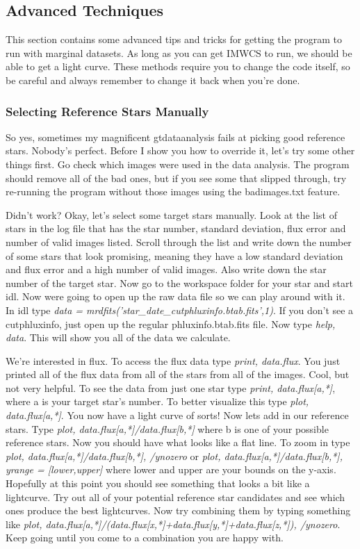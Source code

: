 \documentclass[10pt,preprint]{aastex}
\begin{document}
\subsection{Advanced Techniques}
This section contains some advanced tips and tricks for getting the program to run with marginal datasets. As long as you can get IMWCS to run, we should be able to get a light curve. These methods require you to change the code itself, so be careful and always remember to change it back when you're done.
\subsubsection{Selecting Reference Stars Manually}
So yes, sometimes my magnificent gtdataanalysis fails at picking good reference stars. Nobody's perfect. Before I show you how to override it, let's try some other things first. Go check which images were used in the data analysis. The program should remove all of the bad ones, but if you see some that slipped through, try re-running the program without those images using the badimages.txt feature. 

Didn't work? Okay, let's select some target stars manually. Look at the list of stars in the log file that has the star number, standard deviation, flux error and number of valid images listed. Scroll through the list and write down the number of some stars that look promising, meaning they have a low standard deviation and flux error and a high number of valid images. Also write down the star number of the target star. Now go to the workspace folder for your star and start idl. Now were going to open up the raw data file so we can play around with it. In idl type \emph{data = mrdfits('star\_date\_cutphluxinfo.btab.fits',1)}. If you don't see a cutphluxinfo, just open up the regular phluxinfo.btab.fits file. Now type \emph{help, data}. This will show you all of the data we calculate. 

We're interested in flux. To access the flux data type \emph{print, data.flux}. You just printed all of the flux data from all of the stars from all of the images. Cool, but not very helpful. To see the data from just one star type \emph{print, data.flux[a,*]}, where a is your target star's number. To better visualize this type \emph{plot, data.flux[a,*]}. You now have a light curve of sorts! Now lets add in our reference stars. Type \emph{plot, data.flux[a,*]/data.flux[b,*]} where b is one of your possible reference stars. Now you should have what looks like a flat line. To zoom in type \emph{plot, data.flux[a,*]/data.flux[b,*], /ynozero} or \emph{plot, data.flux[a,*]/data.flux[b,*], yrange = [lower,upper]} where lower and upper are your bounds on the y-axis. Hopefully at this point you should see something that looks a bit like a lightcurve. Try out all of your potential reference star candidates and see which ones produce the best lightcurves. Now try combining them by typing something like \emph{plot, data.flux[a,*]/(data.flux[x,*]+data.flux[y,*]+data.flux[z,*]), /ynozero}. Keep going until you come to a combination you are happy with. 
\end{document}
